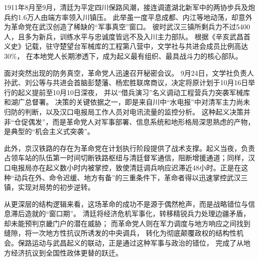 1911年8月至9月，清廷为平定四川保路风潮，接连调遣湖北新军中的两协步兵及炮兵约1.6万人由端方率领入川镇压。
此举虽一度平息成都、内江等地动荡，却意外为革命党在武汉创造了稀缺的“军事真空”窗口。
彼时武汉三镇所剩兵力不过5400人，且多为新兵，训练水平与忠诚度皆远不及入川主力部队。
根据《辛亥武昌首义史》记载，驻守楚望台军械库的工程第八营中，文学社与共进会成员比例高达30\%\autocite{He2006Xinhai}，
在本地党人长期渗透下，成为起义最有组织、最具战斗力的核心部队。

面对突然出现的防务真空，革命党人迅速召开秘密会议。
9月24日，文学社负责人孙武、刘公等与共进会首脑彭楚藩、杨宏胜联席商议，决定将原计划于10月16日举行的起义提前至10月10日深夜，
并以“借兵演习”名义调动工程营兵力突袭军械库和湖广总督署。
决策的关键依据之一，即是来自川中“水电报”中对清军主力尚未归防的判断，以及汉口电报局工作人员对电讯流量的监控分析。
这种起义决策并非“仓促偶发”，而是革命党人对军事部署、信息系统和地形格局深思熟虑的产物，是典型的“机会主义式突袭”。

此外，京汉铁路的存在为革命党在计划执行阶段提供了战术支撑。起义当夜，负责占领车站的队伍第一时间切断铁路枢纽与清廷督军通信，阻断增援通道；同样，汉口电报局亦在起义数小时内被掌控，致使清廷调兵响应迟滞近48小时。正是在这种“动兵在外、命令迟缓、地方有备”的三重条件下，革命者得以迅速掌控武汉三镇，实现对局势的初步逆转。

从更深层的结构逻辑来看，这场革命的成功不是源于偶然枪声，而是战略错位与信息滞后造就的“窗口期”。
清廷将经济危机军事化，转移精锐兵力处理边疆矛盾，却未能预判京畿门户的潜在威胁；
而革命党人则在军力调度与地方响应之间找到缝隙，将一次地方性抗议所诱发的中央调兵，
转化为彻底颠覆政权的结构性机会。保路运动与武昌起义的联动，正是通过这种军事与政治的错位，
完成了从地方经济抗议到全国性政体更替的跃迁。

